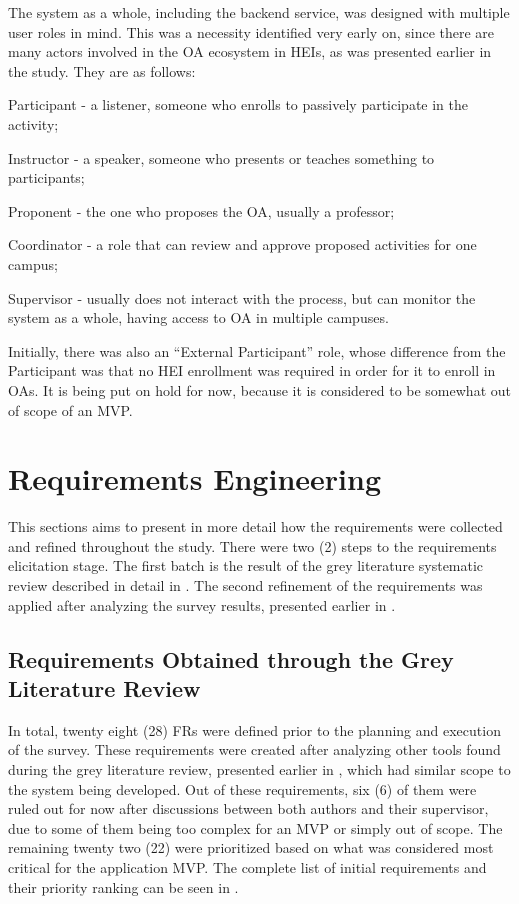The system as a whole, including the backend service, was designed with multiple user roles in mind. This was a necessity identified very early on, since there are many actors involved in the \ac{OA} ecosystem in \acp{HEI}, as was presented earlier in the study. They are as follows:
\begin{inparaenum}[(1)]
  \item Participant - a listener, someone who enrolls to passively participate in the activity;
  \item Instructor - a speaker, someone who presents or teaches something to participants;
  \item Proponent - the one who proposes the \ac{OA}, usually a professor;
  \item Coordinator - a role that can review and approve proposed activities for one campus;
  \item Supervisor - usually does not interact with the process, but can monitor the system as a whole, having access to \ac{OA} in multiple campuses.
\end{inparaenum}
Initially, there was also an ``External Participant'' role, whose difference from the Participant was that no \ac{HEI} enrollment was required in order for it to enroll in \acp{OA}. It is being put on hold for now, because it is considered to be somewhat out of scope of an \ac{MVP}.

\section{Requirements Engineering}\label{ext:requirement-engineering}

This sections aims to present in more detail how the requirements were collected and refined throughout the study. There were two (2) steps to the requirements elicitation stage. The first batch is the result of the grey literature systematic review described in detail in . The second refinement of the requirements was applied after analyzing the survey results, presented earlier in .

\subsection{Requirements Obtained through the Grey Literature Review}\label{ext:requirements-grey}

In total, twenty eight (28) \acp{FR} were defined prior to the planning and execution of the survey. These requirements were created after analyzing other tools found during the grey literature review, presented earlier in , which had similar scope to the system being developed. Out of these requirements, six (6) of them were ruled out for now after discussions between both authors and their supervisor, due to some of them being too complex for an \ac{MVP} or simply out of scope. The remaining twenty two (22) were prioritized based on what was considered most critical for the application \ac{MVP}. The complete list of initial requirements and their priority ranking can be seen in .

